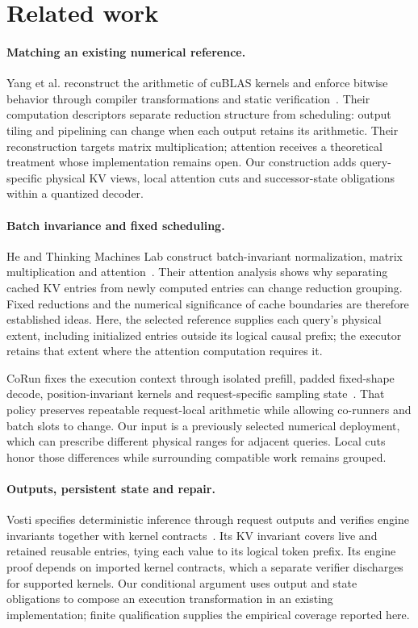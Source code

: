 \section{Related work}
\label{sec:related}

\paragraph{Matching an existing numerical reference.}
Yang et al. reconstruct the arithmetic of cuBLAS kernels and enforce bitwise behavior through compiler transformations and static verification~\cite{taming}. Their computation descriptors separate reduction structure from scheduling: output tiling and pipelining can change when each output retains its arithmetic. Their reconstruction targets matrix multiplication; attention receives a theoretical treatment whose implementation remains open. Our construction adds query-specific physical KV views, local attention cuts and successor-state obligations within a quantized decoder.

\paragraph{Batch invariance and fixed scheduling.}
He and Thinking Machines Lab construct batch-invariant normalization, matrix multiplication and attention~\cite{thinkingmachines}. Their attention analysis shows why separating cached KV entries from newly computed entries can change reduction grouping. Fixed reductions and the numerical significance of cache boundaries are therefore established ideas. Here, the selected reference supplies each query's physical extent, including initialized entries outside its logical causal prefix; the executor retains that extent where the attention computation requires it.

CoRun fixes the execution context through isolated prefill, padded fixed-shape decode, position-invariant kernels and request-specific sampling state~\cite{corun}. That policy preserves repeatable request-local arithmetic while allowing co-runners and batch slots to change. Our input is a previously selected numerical deployment, which can prescribe different physical ranges for adjacent queries. Local cuts honor those differences while surrounding compatible work remains grouped.

\paragraph{Outputs, persistent state and repair.}
Vosti specifies deterministic inference through request outputs and verifies engine invariants together with kernel contracts~\cite{vosti}. Its KV invariant covers live and retained reusable entries, tying each value to its logical token prefix. Its engine proof depends on imported kernel contracts, which a separate verifier discharges for supported kernels. Our conditional argument uses output and state obligations to compose an execution transformation in an existing implementation; finite qualification supplies the empirical coverage reported here.

